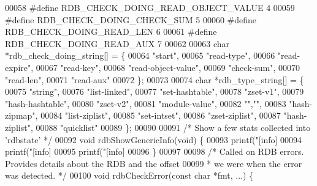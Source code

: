 \begin{DoxyCode}
00058 \textcolor{preprocessor}{#}\textcolor{preprocessor}{define} \textcolor{preprocessor}{RDB\_CHECK\_DOING\_READ\_OBJECT\_VALUE} 4
00059 \textcolor{preprocessor}{#}\textcolor{preprocessor}{define} \textcolor{preprocessor}{RDB\_CHECK\_DOING\_CHECK\_SUM} 5
00060 \textcolor{preprocessor}{#}\textcolor{preprocessor}{define} \textcolor{preprocessor}{RDB\_CHECK\_DOING\_READ\_LEN} 6
00061 \textcolor{preprocessor}{#}\textcolor{preprocessor}{define} \textcolor{preprocessor}{RDB\_CHECK\_DOING\_READ\_AUX} 7
00062 
00063 \textcolor{keywordtype}{char} *rdb\_check\_doing\_string[] = \{
00064     \textcolor{stringliteral}{"start"},
00065     \textcolor{stringliteral}{"read-type"},
00066     \textcolor{stringliteral}{"read-expire"},
00067     \textcolor{stringliteral}{"read-key"},
00068     \textcolor{stringliteral}{"read-object-value"},
00069     \textcolor{stringliteral}{"check-sum"},
00070     \textcolor{stringliteral}{"read-len"},
00071     \textcolor{stringliteral}{"read-aux"}
00072 \};
00073 
00074 \textcolor{keywordtype}{char} *rdb\_type\_string[] = \{
00075     \textcolor{stringliteral}{"string"},
00076     \textcolor{stringliteral}{"list-linked"},
00077     \textcolor{stringliteral}{"set-hashtable"},
00078     \textcolor{stringliteral}{"zset-v1"},
00079     \textcolor{stringliteral}{"hash-hashtable"},
00080     \textcolor{stringliteral}{"zset-v2"},
00081     \textcolor{stringliteral}{"module-value"},
00082     \textcolor{stringliteral}{""},\textcolor{stringliteral}{""},
00083     \textcolor{stringliteral}{"hash-zipmap"},
00084     \textcolor{stringliteral}{"list-ziplist"},
00085     \textcolor{stringliteral}{"set-intset"},
00086     \textcolor{stringliteral}{"zset-ziplist"},
00087     \textcolor{stringliteral}{"hash-ziplist"},
00088     \textcolor{stringliteral}{"quicklist"}
00089 \};
00090 
00091 \textcolor{comment}{/* Show a few stats collected into 'rdbstate' */}
00092 \textcolor{keywordtype}{void} rdbShowGenericInfo(\textcolor{keywordtype}{void}) \{
00093     printf(\textcolor{stringliteral}{"[info] %
00094     printf(\textcolor{stringliteral}{"[info] %
00095     printf(\textcolor{stringliteral}{"[info] %
00096 \}
00097 
00098 \textcolor{comment}{/* Called on RDB errors. Provides details about the RDB and the offset}
00099 \textcolor{comment}{ * we were when the error was detected. */}
00100 \textcolor{keywordtype}{void} rdbCheckError(\textcolor{keyword}{const} \textcolor{keywordtype}{char} *fmt, ...) \{
}}}
\end{DoxyCode}
